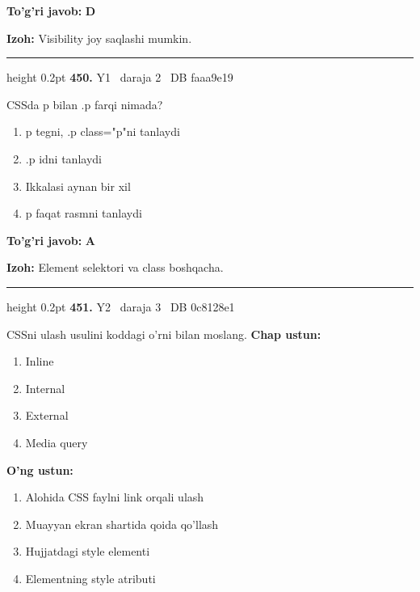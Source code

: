 \documentclass[10pt,a4paper,oneside]{article}
\begin{document}
\begin{tcolorbox}[enhanced,breakable,colback=teal!4,colframe=teal!45!black,boxrule=0.45pt,arc=1.2mm,left=2.8mm,right=2.8mm,top=2mm,bottom=2mm,before skip=2mm,after skip=2mm]
\textbf{\color{teal}To'g'ri javob:} \textbf{D}
\par\smallskip
\textbf{Izoh:} Visibility joy saqlashi mumkin.
\end{tcolorbox}
\vspace{2mm}\hrule height 0.2pt \vspace{4mm}
\hypertarget{q450}{\textbf{\color{ink}450.}}  {\color{muted}\scriptsize Y1 \textbullet\ daraja 2 \textbullet\ DB faaa9e19}
\par
CSSda p bilan .p farqi nimada?
\begin{enumerate}[label=\Alph*),leftmargin=9mm]
\item p tegni, .p class="p"ni tanlaydi
\item .p idni tanlaydi
\item Ikkalasi aynan bir xil
\item p faqat rasmni tanlaydi
\end{enumerate}
\begin{tcolorbox}[enhanced,breakable,colback=teal!4,colframe=teal!45!black,boxrule=0.45pt,arc=1.2mm,left=2.8mm,right=2.8mm,top=2mm,bottom=2mm,before skip=2mm,after skip=2mm]
\textbf{\color{teal}To'g'ri javob:} \textbf{A}
\par\smallskip
\textbf{Izoh:} Element selektori va class boshqacha.
\end{tcolorbox}
\vspace{2mm}\hrule height 0.2pt \vspace{4mm}
\hypertarget{q451}{\textbf{\color{ink}451.}}  {\color{muted}\scriptsize Y2 \textbullet\ daraja 3 \textbullet\ DB 0c8128e1}
\par
CSSni ulash usulini koddagi o'rni bilan moslang.
\textbf{\footnotesize Chap ustun:}
\begin{enumerate}[label=\arabic*),leftmargin=9mm]
\item Inline
\item Internal
\item External
\item Media query
\end{enumerate}
\textbf{\footnotesize O'ng ustun:}
\begin{enumerate}[label=\Alph*),leftmargin=9mm]
\item Alohida CSS faylni link orqali ulash
\item Muayyan ekran shartida qoida qo'llash
\item Hujjatdagi style elementi
\item Elementning style atributi
\end{enumerate}
\end{document}
